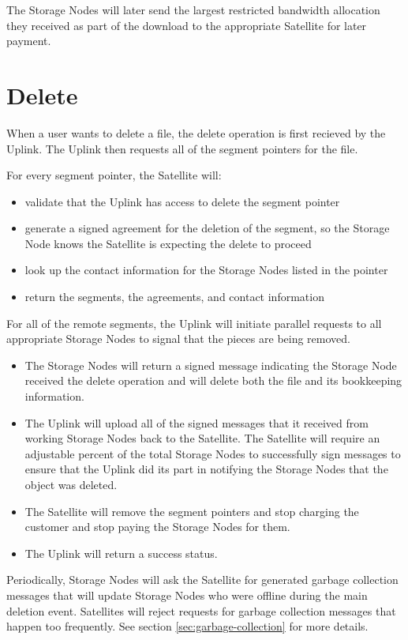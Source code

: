 \documentclass[8pt,fleqn,openany]{book}
\begin{document}
The Storage Nodes will later send the largest restricted
  bandwidth allocation they received as part of the download to the appropriate
  Satellite for later payment.

\section{Delete}

When a user wants to delete a file, the delete operation is first recieved
by the Uplink. The Uplink then requests all of the segment pointers for the file.

For every segment pointer, the Satellite will:
  \begin{itemize}
  \item validate that the Uplink has access to delete the segment pointer
  \item generate a signed agreement for the deletion of the segment, so the
    Storage Node knows the Satellite is expecting the delete to proceed
  \item look up the contact information for the Storage Nodes listed in the
  pointer
  \item return the segments, the agreements, and contact information
  \end{itemize}

For all of the remote segments, the Uplink will
  initiate parallel requests to all appropriate Storage Nodes to signal that the
  pieces are being removed.

\begin{itemize}
\item The Storage Nodes will return a signed message indicating the Storage Node
received the
delete operation and will delete both the file and its bookkeeping information.
\item The Uplink will upload all of the signed messages that it received from
  working Storage Nodes back to the Satellite. The Satellite will require an
  adjustable percent of the total Storage Nodes to successfully sign messages
  to ensure that the Uplink did its part in notifying the Storage Nodes that the
  object was deleted.
\item The Satellite will remove the segment pointers and stop charging the
  customer and stop paying the Storage Nodes for them.
\item The Uplink will return a success status.
\end{itemize}

Periodically, Storage Nodes will ask the Satellite for generated garbage
  collection messages that will update Storage Nodes who were offline during the
  main deletion event.
  Satellites will reject requests for garbage collection messages that
  happen too frequently. See section \ref{sec:garbage-collection} for more
  details.
\end{document}
